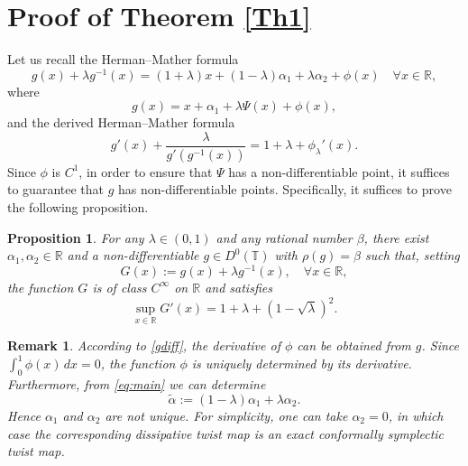 \documentclass{amsart}
\newtheorem{Proposition}[Definition]{Proposition}
\newtheorem{Remark}[Theorem]{Remark}
\begin{document}
	
	
	\vspace{1em}
	
	\section{\sc Proof of Theorem \ref{Th1}}
	Let us recall the  Herman--Mather formula
	\begin{equation}\tag{A}
		g(x) + \lambda g^{-1}(x) = (1+\lambda)x + (1-\lambda)\alpha_1 + \lambda\alpha_2 + \phi(x) \quad \forall x \in \mathbb{R},
	\end{equation}
	where
	\[
	g(x) = x + \alpha_1 + \lambda \Psi(x) + \phi(x),
	\]
	and the derived Herman--Mather formula
	\begin{equation}\tag{A'}
		g'(x) + \frac{\lambda }{g'(g^{-1}(x))} = 1+\lambda + \phi_\lambda'(x).
	\end{equation}
	Since \(\phi\) is \(C^1\), in order to ensure that \(\Psi\) has a non-differentiable point, it suffices to guarantee that \(g\) has non-differentiable points. Specifically, it suffices to prove the following proposition.
	
	\begin{Proposition}\label{hf1}
		For any \(\lambda\in(0,1)\) and any rational number \(\beta\), there exist \(\alpha_1,\alpha_2\in\mathbb{R}\) and a non-differentiable \(g\in D^0(\mathbb{T})\) with \(\rho(g)=\beta\) such that, setting
		\[
		G(x) := g(x) + \lambda g^{-1}(x), \quad \forall x \in \mathbb{R},
		\]
		the function \(G\) is of class \(C^\infty\) on \(\mathbb{R}\) and satisfies
		\begin{equation}\label{Gcond}
			\sup_{x\in\mathbb{R}} G'(x) = 1+\lambda + (1-\sqrt{\lambda})^2.
		\end{equation}
	\end{Proposition}
	
	\vspace{1ex}
	\begin{Remark}
		According to \eqref{gdiff}, the derivative of \(\phi\) can be obtained from \(g\). Since \(\int_{0}^{1} \phi(x)\,dx = 0\), the function \(\phi\) is uniquely determined by its derivative. Furthermore, from \eqref{eq:main} we can determine
		\[
		\tilde{\alpha} := (1-\lambda)\alpha_1 + \lambda\alpha_2.
		\]
		Hence \(\alpha_1\) and \(\alpha_2\) are not unique. For simplicity, one can take \(\alpha_2 = 0\), in which case the corresponding dissipative twist map is an exact conformally symplectic twist map.
	\end{Remark}
	
\end{document}
